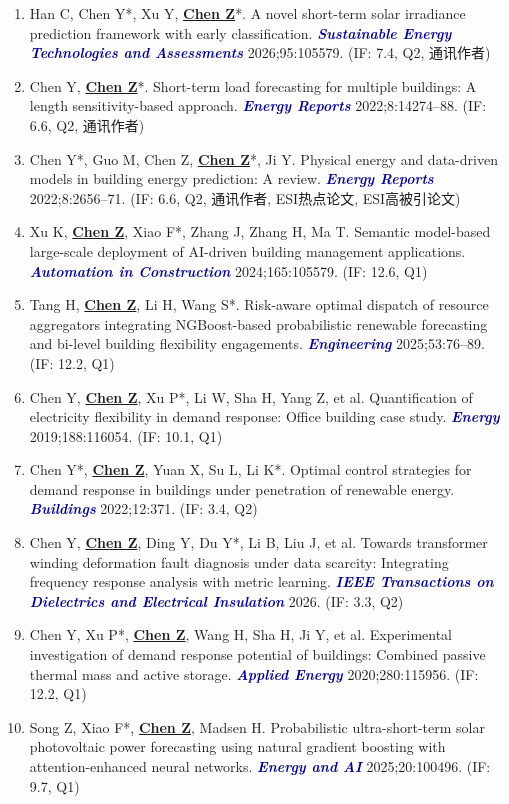 \documentclass[11pt,a4paper]{article}
\newcommand{\me}[1]{\underline{\textbf{#1}}}
\newcommand{\journal}[1]{\textcolor{darkblue}{\textbf{\textit{#1}}}}
\begin{document}
\begin{enumerate}
\item Han C, Chen Y*, Xu Y, \me{Chen Z}*. A novel short-term solar irradiance prediction framework with early classification. \journal{Sustainable Energy Technologies and Assessments} 2026;95:105579. (IF: 7.4, Q2, 通讯作者)
\item Chen Y, \me{Chen Z}*. Short-term load forecasting for multiple buildings: A length sensitivity-based approach. \journal{Energy Reports} 2022;8:14274--88. (IF: 6.6, Q2, 通讯作者)
\item Chen Y*, Guo M, Chen Z, \me{Chen Z}*, Ji Y. Physical energy and data-driven models in building energy prediction: A review. \journal{Energy Reports} 2022;8:2656--71. (IF: 6.6, Q2, 通讯作者, ESI热点论文, ESI高被引论文)
\item Xu K, \me{Chen Z}, Xiao F*, Zhang J, Zhang H, Ma T. Semantic model-based large-scale deployment of AI-driven building management applications. \journal{Automation in Construction} 2024;165:105579. (IF: 12.6, Q1)
\item Tang H, \me{Chen Z}, Li H, Wang S*. Risk-aware optimal dispatch of resource aggregators integrating NGBoost-based probabilistic renewable forecasting and bi-level building flexibility engagements. \journal{Engineering} 2025;53:76--89. (IF: 12.2, Q1)
\item Chen Y, \me{Chen Z}, Xu P*, Li W, Sha H, Yang Z, et al. Quantification of electricity flexibility in demand response: Office building case study. \journal{Energy} 2019;188:116054. (IF: 10.1, Q1)
\item Chen Y*, \me{Chen Z}, Yuan X, Su L, Li K*. Optimal control strategies for demand response in buildings under penetration of renewable energy. \journal{Buildings} 2022;12:371. (IF: 3.4, Q2)
\item Chen Y, \me{Chen Z}, Ding Y, Du Y*, Li B, Liu J, et al. Towards transformer winding deformation fault diagnosis under data scarcity: Integrating frequency response analysis with metric learning. \journal{IEEE Transactions on Dielectrics and Electrical Insulation} 2026. (IF: 3.3, Q2)
\item Chen Y, Xu P*, \me{Chen Z}, Wang H, Sha H, Ji Y, et al. Experimental investigation of demand response potential of buildings: Combined passive thermal mass and active storage. \journal{Applied Energy} 2020;280:115956. (IF: 12.2, Q1)
\item Song Z, Xiao F*, \me{Chen Z}, Madsen H. Probabilistic ultra-short-term solar photovoltaic power forecasting using natural gradient boosting with attention-enhanced neural networks. \journal{Energy and AI} 2025;20:100496. (IF: 9.7, Q1)

\end{enumerate}
\end{document}
